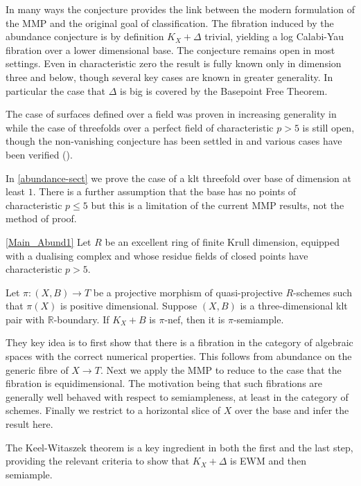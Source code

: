 \documentclass[a4paper,12pt]{book}
\begin{document}
	In many ways the conjecture provides the link between the modern formulation of the MMP and the original goal of classification. The fibration induced by the abundance conjecture is by definition $K_{X}+\Delta$ trivial, yielding a log Calabi-Yau fibration over a lower dimensional base. The conjecture remains open in most settings. Even in characteristic zero the result is fully known only in dimension three and below, though several key cases are known in greater generality. In particular the case that $\Delta$ is big is covered by the Basepoint Free Theorem.

	The case of surfaces defined over a field was proven in increasing generality in \cite{fujino2012log, Tan14, tanaka2020abundance} while the case of threefolds over a perfect field of characteristic $p>5$ is still open, though the non-vanishing conjecture has been settled in \cite{XZ19, Wit} and various cases have been verified (\cite{DW19, Zha20}).
	
	In \autoref{abundance-sect} we prove the case of a klt threefold over base of dimension at least $1$. There is a further assumption that the base has no points of characteristic $p \leq 5$ but this is a limitation of the current MMP results, not the method of proof.
	
	\begin{theo}\autoref{Main_Abund1}
		Let $R$ be an excellent ring of finite Krull dimension, equipped with a dualising complex and whose residue fields of closed points have characteristic $p>5$.
		
		Let $\pi \colon (X,B) \to T$ be a projective morphism of quasi-projective $R$-schemes such that $\pi(X)$ is positive dimensional.
		Suppose $(X,B)$ is a three-dimensional klt pair with $\mathbb{R}$-boundary. If $K_X+B$ is $\pi$-nef, then it is $\pi$-semiample.
	\end{theo}
	
	They key idea is to first show that there is a fibration in the category of algebraic spaces with the correct numerical properties. This follows from abundance on the generic fibre of $X \to T$. Next we apply the MMP to reduce to the case that the fibration is equidimensional. The motivation being that such fibrations are generally well behaved with respect to semiampleness, at least in the category of schemes. Finally we restrict to a horizontal slice of $X$ over the base and infer the result here.
	
	The Keel-Witaszek theorem is a key ingredient in both the first and the last step, providing the relevant criteria to show that $K_{X}+\Delta$ is EWM and then semiample.
	
\end{document}
